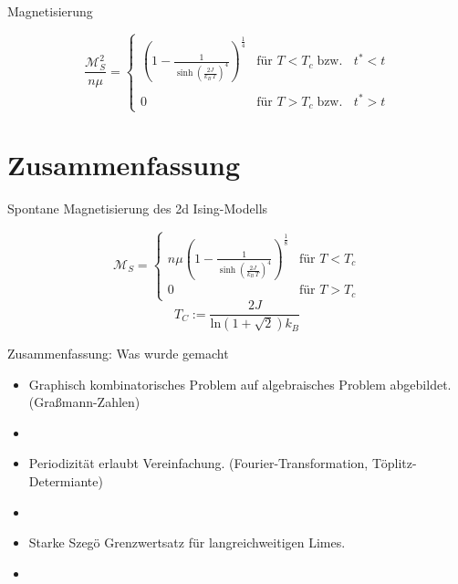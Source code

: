 \documentclass[11pt]{beamer}
\renewcommand{\ln}[1]{\mathrm{ln}\left( #1 \right)}
\begin{document}
    \begin{frame}{Magnetisierung}
    \Large
    
    \begin{equation} \nonumber
    \frac{\mathcal{M}_S^2}{ n \mu} = \left\{ \begin{array}{cr} \left(1-\frac{1}{\sinh(\frac{2J}{k_B\,T})^4}\right)^{\frac{1}{4}} & \text{für } T < T_c \;\text{bzw. }\;\; t^* < t \\ & \\0 &\text{für } T > T_c  \;\text{bzw. }\;\; t^* > t \end{array} \right.
    \end{equation}
    
    \end{frame}
    
        
\section{Zusammenfassung}
    
        \begin{frame}{Spontane Magnetisierung des 2d Ising-Modells}
    
    \begin{grayframe}
    {\Large
    \begin{equation} \nonumber
    \mathcal{M}_S = \left\{ \begin{array}{cr} n \mu \left(1-\frac{1}{\sinh(\frac{2J}{k_B\,T})^4}\right)^{\frac{1}{8}} & \text{für } T < T_c \\ 0 &\text{für } T > T_c   \end{array} \right.
    \end{equation}}
    \begin{equation} \nonumber
    T_C  := \frac{2 J}{ \ln{1+\sqrt{2}} k_B}
    \end{equation}
\end{grayframe}
    
    \end{frame}

    \begin{frame}{Zusammenfassung: Was wurde gemacht}
    \begin{itemize} 
    \item Graphisch kombinatorisches Problem auf algebraisches Problem abgebildet. (Graßmann-Zahlen)
    \item[]
    \item Periodizität erlaubt Vereinfachung. (Fourier-Transformation, Töplitz-Determiante)
    \item[]
    \item Starke Szegö Grenzwertsatz für
    langreichweitigen Limes.
    \item[]
    \end{itemize}
    \end{frame}
    
\end{document}
